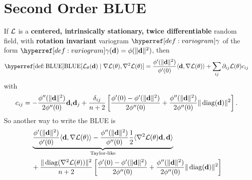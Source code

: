 \section{Second Order BLUE}

\begin{lemma}
	If \(\mathcal{L}\) is a \textbf{centered, intrinsically stationary, twice
	differentiable} random field, with \textbf{rotation invariant} variogram
	\(\variogram\) of the form \(\variogram(\step)=\phi(\|\step\|^2)\), then
	\begin{equation*}
		\BLUE[\Loss_\param(\step)\mid \grad\Loss(\param), \hessian\Loss(\param)]
		= \frac{\phi'(\|\step\|^2)}{\phi'(0)}\langle \step, \grad\Loss(\param)\rangle
		+ \sum_{ij}\partial_{ij}\Loss(\param)c_{ij}
	\end{equation*}
	with
	\begin{equation*}
		c_{ij} =
			- \frac{\phi''(\|\mathbf{d}\|^2)}{2\phi''(0)}\mathbf{d}_i\mathbf{d}_j
			+ \frac{\delta_{ij}}{n+2}\left[
				\frac{\phi'(0) - \phi'(\|\mathbf{d}\|^2)}{2\phi''(0)}
				+ \frac{\phi''(\|\mathbf{d}\|^2)}{2\phi''(0)}\|\operatorname{diag}(\mathbf{d})\|^2
			\right].
	\end{equation*}
	So another way to write the BLUE is
	\begin{equation*}
	\begin{aligned}
		&\underbrace{
			\frac{\phi'(\|\mathbf{d}\|^2)}{\phi'(0)}\langle \mathbf{d}, \nabla\mathcal{L}(\theta)\rangle
			- \frac{\phi''(\|\mathbf{d}\|^2)}{\phi''(0)} \frac12\langle \nabla^2\mathcal{L}(\theta)\mathbf{d}, \mathbf{d}\rangle
		}_{\text{Taylor-like}}\\
		&+ \frac{\|\operatorname{diag}(\nabla^2 \mathcal{L}(\theta))\|^2}{n+2}\left[
				\frac{\phi'(0) - \phi'(\|\mathbf{d}\|^2)}{2\phi''(0)}
				+ \frac{\phi''(\|\mathbf{d}\|^2)}{2\phi''(0)}\|\operatorname{diag}(\mathbf{d})\|^2
		\right]
	\end{aligned}
	\end{equation*}
\end{lemma}

